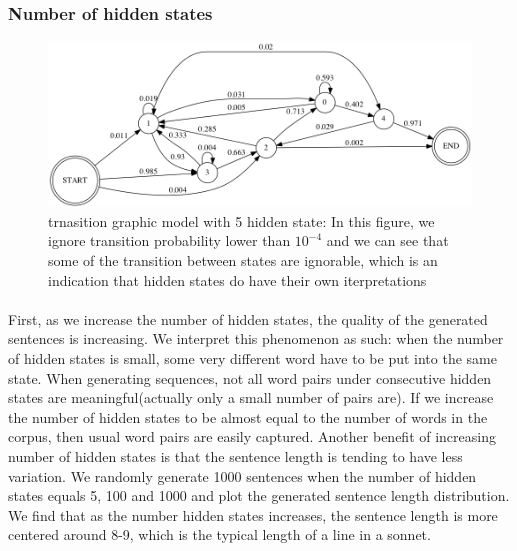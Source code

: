 %
\vspace{5pt}
\subsubsection{Number of hidden states}
\vspace{5pt}
\begin{figure}[h!]
 \centering
 \includegraphics[width=1\textwidth]{./figure/HiddenMarkov5.png}
 \caption{trnasition graphic model with 5 hidden state: In this figure, we ignore transition probability lower than $10 ^{-4}$ and we can see that some of the transition between states are ignorable, which is an indication that hidden states do have their own iterpretations}
 \end{figure}
\paragraph{} First, as we increase the number of hidden states, the quality of the generated sentences is increasing. We interpret this phenomenon as such: when the number of hidden states is small, some very different word have to be put into the same state. When generating sequences, not all word pairs under consecutive hidden states are meaningful(actually only a small number of pairs are). If we increase the number of hidden states to be almost equal to the number of words in the corpus, then usual word pairs are easily captured. Another benefit of increasing number of hidden states is that the sentence length is tending to have less variation. We randomly generate 1000 sentences when the number of hidden states equals 5, 100 and 1000 and plot the generated sentence length distribution. We find that as the number hidden states increases, the sentence length is more centered around 8-9, which is the typical length of a line in a sonnet.

